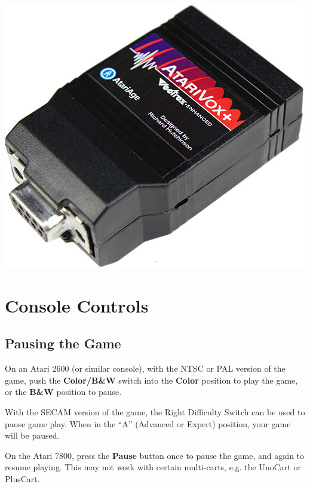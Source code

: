 \documentclass[10pt,twocolumn,openany,article]{memoir}
\begin{document}
\ifdefined\ATARIAGESAVE
\vfill
\includegraphics[width=\columnwidth]{../Manual/AtariVox.jpeg}
\fi


\pagebreak
{}

\section{Console Controls}

\subsection{Pausing the Game}

On an Atari 2600  (or similar console), with the NTSC  or PAL version of
the game,  push the  \textbf{Color/B\&W} switch into  the \textbf{Color}
position  to play  the game,  or  the \textbf{B\&W}  position to  pause.

With the SECAM  version of the game, the Right  Difficulty Switch can be
used  to  pause game  play.  When  in  the  ``A'' (Advanced  or  Expert)
position, your  game will be paused.

On the  Atari 7800, press  the \textbf{Pause}  button once to  pause the
game, and again to resume playing. \ifdefined\ATARIAGESAVE\else This may
not work with certain multi-carts, e.g. the UnoCart or PlusCart. \fi
\end{document}
